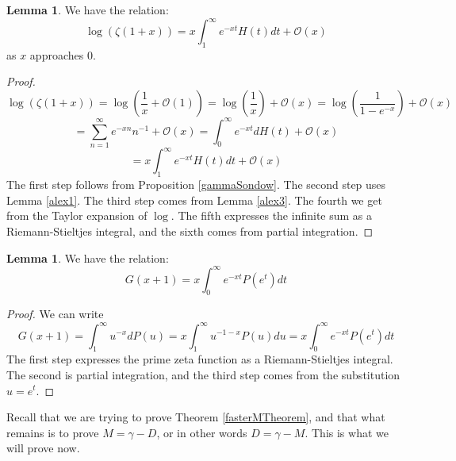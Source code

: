 \documentclass{article}
\theoremstyle{definition}
\newtheorem{lemma}[theorem]{Lemma}
\theoremstyle{remark}
\begin{document}
\begin{lemma}\label{log(zeta(1+x) integral}
We have the relation:
$$\log\left(\zeta(1+x)\right)=x \int_1^{\infty}e^{-xt}H(t)dt+\mathcal{O}(x)$$
as $x$ approaches $0$.
\end{lemma}
\begin{proof}
$$\log \left(\zeta(1+x)\right)= \log \left(\frac{1}{x}+ \mathcal{O}(1) \right)=\log \left(\frac{1}{x} \right)+\mathcal{O}(x)=\log \left( \frac{1}{1-e^{-x}} \right) + \mathcal{O}(x) $$
$$=\sum_{n=1}^{\infty}e^{-xn}n^{-1}+\mathcal{O}(x)=\int_{0}^{\infty}e^{-xt}dH(t)+\mathcal{O}(x)$$
$$=x \int_{1}^{\infty}e^{-xt}H(t)dt+\mathcal{O}(x)$$
The first step follows from Proposition \ref{gammaSondow}. The second step uses Lemma \ref{alex1}. The third step comes from Lemma \ref{alex3}. The fourth we get from the Taylor expansion of $\log$. The fifth expresses the infinite sum as a Riemann-Stieltjes integral, and the sixth comes from partial integration.
\end{proof}

\begin{lemma}
We have the relation:
$$G(x+1)=x\int
_0^{\infty}e^{-xt}P(e^t)dt$$
\end{lemma}
\begin{proof}
We can write
$$G(x+1)=\int_1^{\infty}u^{-x}dP(u)=x\int_1^{\infty}u^{-1-x}P(u)du=x\int
_0^{\infty}e^{-xt}P(e^t)dt$$
The first step expresses the prime zeta function as a Riemann-Stieltjes integral. The second is partial integration, and the third step comes from the substitution $u=e^t$.
\end{proof}

Recall that we are trying to prove Theorem \ref{fasterMTheorem}, and that what remains is to prove $M=\gamma-D$, or in other words $D=\gamma-M$. This is what we will prove now.
\end{document}
